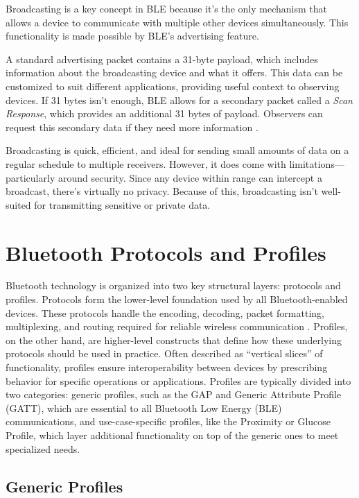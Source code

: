Broadcasting is a key concept in BLE because it’s the only mechanism that allows a device to communicate with multiple other devices simultaneously. This functionality is made possible by BLE’s advertising feature.

A standard advertising packet contains a 31-byte payload, which includes information about the broadcasting device and what it offers. This data can be customized to suit different applications, providing useful context to observing devices. If 31 bytes isn’t enough, BLE allows for a secondary packet called a \textit{Scan Response}, which provides an additional 31 bytes of payload. Observers can request this secondary data if they need more information \cite{gettingstartedwble}.

Broadcasting is quick, efficient, and ideal for sending small amounts of data on a regular schedule to multiple receivers. However, it does come with limitations—particularly around security. Since any device within range can intercept a broadcast, there’s virtually no privacy. Because of this, broadcasting isn’t well-suited for transmitting sensitive or private data.

\section{Bluetooth Protocols and Profiles}
Bluetooth technology is organized into two key structural layers: protocols and profiles. Protocols form the lower-level foundation used by all Bluetooth-enabled devices. These protocols handle the encoding, decoding, packet formatting, multiplexing, and routing required for reliable wireless communication \cite{gettingstartedwble}.
Profiles, on the other hand, are higher-level constructs that define how these underlying protocols should be used in practice. Often described as “vertical slices” of functionality, profiles ensure interoperability between devices by prescribing behavior for specific operations or applications. Profiles are typically divided into two categories: generic profiles, such as the GAP and Generic Attribute Profile (GATT), which are essential to all Bluetooth Low Energy (BLE) communications, and use-case-specific profiles, like the Proximity or Glucose Profile, which layer additional functionality on top of the generic ones to meet specialized needs.

\subsection{Generic Profiles}

